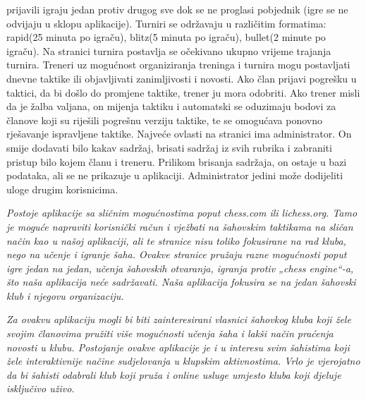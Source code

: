 {			prijavili igraju jedan protiv drugog sve dok se ne proglasi pobjednik
			(igre se ne odvijaju u sklopu aplikacije). Turniri se održavaju u
			različitim formatima: rapid(25 minuta po igraču), blitz(5 minuta po
			igraču), bullet(2 minute po igraču). Na stranici turnira postavlja se
			očekivano ukupno vrijeme trajanja turnira. Treneri uz mogućnost
			organiziranja treninga i turnira mogu postavljati dnevne taktike ili
			objavljivati zanimljivosti i novosti. Ako član prijavi pogrešku u
			taktici, da bi došlo do promjene taktike, trener ju mora odobriti. Ako
			trener misli da je žalba valjana, on mijenja taktiku i automatski se
			oduzimaju bodovi za članove koji su riješili pogrešnu verziju taktike,
			te se omogućava ponovno rješavanje ispravljene taktike. Najveće ovlasti
			na stranici ima administrator. On smije dodavati bilo kakav sadržaj,
			brisati sadržaj iz svih rubrika i zabraniti pristup bilo kojem članu i
			treneru. Prilikom brisanja sadržaja, on ostaje u bazi podataka, ali se
			ne prikazuje u aplikaciji. Administrator jedini može dodijeliti uloge
			drugim korisnicima. }
			
			\textit{ Postoje aplikacije sa sličnim mogućnostima poput chess.com ili lichess.org. Tamo
			je moguće napraviti korisnički račun i vježbati na šahovskim taktikama
			na sličan način kao u našoj aplikaciji, ali te stranice nisu toliko
			fokusirane na rad kluba, nego na učenje i igranje šaha. Ovakve stranice
			pružaju razne mogućnosti poput igre jedan na jedan, učenja šahovskih
			otvaranja, igranja protiv „chess engine``-a, što naša aplikacija neće
			sadržavati. Naša aplikacija fokusira se na jedan šahovski klub i njegovu
			organizaciju. }
			
			
		\textit{	Za ovakvu aplikaciju mogli bi biti zainteresirani vlasnici šahovkog
			kluba koji žele svojim članovima pružiti više mogućnosti učenja šaha i
			lakši način praćenja novosti u klubu. Postojanje ovakve aplikacije je i
			u interesu svim šahistima koji žele interaktivnije načine sudjelovanja u
			klupskim aktivnostima. Vrlo je vjerojatno da bi šahisti odabrali klub
			koji pruža i online usluge umjesto kluba koji djeluje isključivo uživo.}
			
